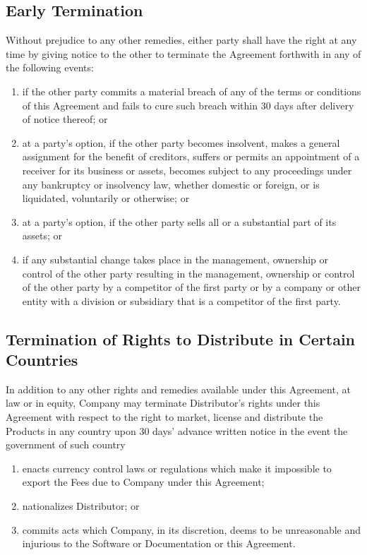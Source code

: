 \documentclass[letterpaper,10pt,english]{sphinxmanual}
\begin{document}
\subsection{Early Termination}
\label{\detokenize{terminiation:early-termination}}
Without prejudice to any other remedies, either party shall have the right at any time by giving notice to the other to terminate the Agreement forthwith in any of the following events:
\begin{enumerate}
\item {} 
if the other party commits a material breach of any of the terms or conditions of this Agreement and fails to cure such breach within 30 days after delivery of notice thereof; or

\item {} 
at a party’s option, if the other party becomes insolvent, makes a general assignment for the benefit of creditors, suffers or permits an appointment of a receiver for its business or assets, becomes subject to any proceedings under any bankruptcy or insolvency law, whether domestic or foreign, or is liquidated, voluntarily or otherwise; or

\item {} 
at a party’s option, if the other party sells all or a substantial part of its assets; or

\item {} 
if any substantial change takes place in the management, ownership or control of the other party resulting in the management, ownership or control of the other party by a competitor of the first party or by a company or other entity with a division or subsidiary that is a competitor of the first party.

\end{enumerate}


\subsection{Termination of Rights to Distribute in Certain Countries}
\label{\detokenize{terminiation:termination-of-rights-to-distribute-in-certain-countries}}
In addition to any other rights and remedies available under this Agreement, at law or in equity, Company may terminate Distributor’s rights under this Agreement with respect to the right to market, license and distribute the Products in any country upon 30 days’ advance written notice in the event the government of such country
\begin{enumerate}
\item {} 
enacts currency control laws or regulations which make it impossible to export the Fees due to Company under this Agreement;

\item {} 
nationalizes Distributor; or

\item {} 
commits acts which Company, in its discretion, deems to be unreasonable and injurious to the Software or Documentation or this Agreement.

\end{enumerate}
\end{document}
